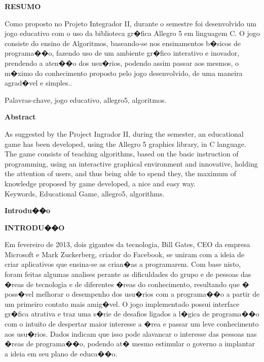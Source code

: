 \documentclass[a4paper]{article}
\begin{document}
\break

\begin{flushleft}
\textbf{\large RESUMO}
\end{flushleft}

Como proposto no Projeto Integrador II, durante o semestre foi desenvolvido
um jogo educativo com o uso da biblioteca gr�fica Allegro 5 em linguagem C. O jogo
consiste do ensino de Algoritmos, baseando-se nos ensinamentos b�sicos de
programa��o, fazendo uso de um ambiente gr�fico interativo e inovador, prendendo a
aten��o dos usu�rios, podendo assim passar aos mesmos, o m�ximo do conhecimento
proposto pelo jogo desenvolvido, de uma maneira agrad�vel e simples..\

Palavras-chave, jogo educativo, allegro5, algoritmos.\\	

\break

\begin{flushleft}
\textbf{\large Abstract}
\end{flushleft}

As suggested by the Project Ingrador II, during the semester, an educational
game has been developed, using the Allegro 5 graphics library, in C language. The game
consists of teaching algorithms, based on the basic instruction of programming, using an
interactive graphical environment and innovative, holding the attention of users, and
thus being able to spend they, the maximum of knowledge proposed by game developed, a
nice and easy way.\\

Keywords, Educational Game, allegro5, algorithms.\\

\break


\begin{center}
\Large\textbf{Introdu��o}
\end{center}

\break

\begin{flushleft}
\textbf{\large INTRODU��O}
\end{flushleft}

Em fevereiro de 2013, dois gigantes da tecnologia, Bill Gates, CEO da empresa
Microsoft e Mark Zuckerberg, criador do Facebook, se uniram com a ideia de criar
aplicativos que ensina-se as crian�as a programarem.
Com base nisto, foram feitas algumas analises perante as dificuldades do grupo e
de pessoas das �reas de tecnologia e de diferentes �reas do conhecimento, resultando
que � poss�vel melhorar o desempenho dos usu�rios com a programa��o a partir de um
primeiro contato mais amig�vel.
O jogo implementado possui interface gr�fica atrativa e traz uma s�rie de
desafios ligados a l�gica de programa��o com o intuito de despertar maior interesse a
�rea e passar um leve conhecimento aos usu�rios.
Dados indicam que isso pode alavancar o interesse das pessoas nas �reas de
programa��o, podendo at� mesmo estimular o governo a implantar a ideia em seu plano
de educa��o.\\
\end{document}
